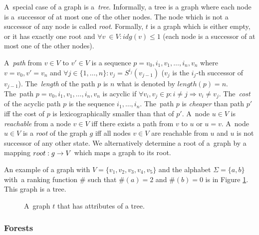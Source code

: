 \documentclass[a4paper, 12pt]{article}
\begin{document}
A~special case of a graph is a~\emph{tree}.
Informally, a tree is a graph where each node is
a~successor of at most one of the other nodes.
The node which is not a successor of any node is called \emph{root}.
Formally, $t$ is a graph which is either empty, or it has exactly one root and $\forall v~\in V: idg(v) \leq 1$
(each node is a successor of at most one of the other nodes).

A~\emph{path} from $v\in V$ to $v' \in V$ is a sequence $p=v_0, i_1, v_1, \ldots, i_n, v_n$ where $v=v_0, v' = v_n$
and $\forall j \in \{1,\ldots,n\}: v_j = S^{i_j}(v_{j-1})$ ($v_j$ is the $i_j$-th successor of $v_{j-1}$).
The~\emph{length} of the path $p$ is $n$ what is denoted by $length(p) = n$.
The~path $p=v_0,i_1,v_1,\ldots,i_n,v_n$ is acyclic if $\forall v_i,v_j \in p: i \neq j \Rightarrow v_i \neq v_j$.
The~\emph{cost} of the acyclic path $p$ is the sequence $i_1, \ldots, i_n$.
The~path $p$ is \emph{cheaper} than path $p'$ iff the cost of $p$ is lexicographically smaller than that of $p'$. 
A~node $u \in V$ is \emph{reachable} from a node $v \in V$ iff there exists a path from $v$ to $u$ or $u=v$.
A~node $u \in V$ is a \emph{root} of the graph $g$ iff all nodes $v \in V$ are reachable from $u$
and $u$ is not successor of any other state.
We alternatively determine a root of a~graph by a mapping $root: g \rightarrow V$
which maps a graph to its root.

An example of a graph with $V=\{v_1,v_2,v_3,v_4,v_5\}$ and
the alphabet $\Sigma = \{a,b\}$ with~a ranking function $\#$ such that $\#(a) = 2$ and $\#(b) = 0$
is in Figure \ref{fig:graph_tree}.
This graph is a tree.

	\begin{figure}[bth]
		\begin{center}
			
		\end{center}
		\caption{A~graph $t$ that has attributes of a tree.}
		\label{fig:graph_tree}
	\end{figure}
	\label{ex:graph}

\subsubsection{Forests}
\label{subsec:forests}
\end{document}
